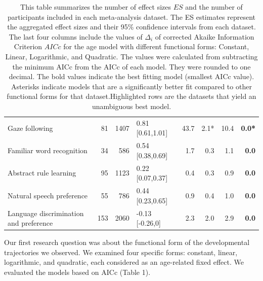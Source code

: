 \documentclass[10pt, letterpaper]{article}
\begin{document}
\begin{table}[ht]
\begin{tabular}{l|r|r|l|r|r|r|r}
Gaze following  & 81 & 1407 & 0.81 [0.61,1.01] & 43.7 & 2.1* & 10.4 & \textbf{0.0*}\\
Familiar word recognition & 34 & 586 & 0.54 [0.38,0.69] & 1.7 & 0.3 & 1.1 & \textbf{0.0}\\
Abstract rule learning & 95 & 1123 & 0.22 [0.07,0.37] & 0.4 & 0.3 & 0.9 & \textbf{0.0}\\
Natural speech preference & 55 & 786 & 0.44 [0.23,0.65] & 0.9 & 0.4 & 1.0 & \textbf{0.0}\\
Language discrimination and preference & 153 & 2060 & -0.13 [-0.26,0] & 2.3 & 2.0 & 2.9 & \textbf{0.0}\\


\hline
\end{tabular}
\caption{\label{demo-table}This table summarizes the number of effect sizes \(ES\) and the number of participants included in each meta-analysis dataset. The ES estimates represent the aggregated effect sizes and their 95\% confidence intervals from each dataset. The last four columns include the values of $\Delta_{i}$ of corrected Akaike Information Criterion \(AICc\) for the age model with different functional forms: Constant, Linear, Logarithmic, and Quadratic. The values were calculated from subtracting the minimum AICc from the AICc of each model. They were rounded to one decimal. The bold values indicate the best fitting model (smallest AICc value). Asterisks indicate models that are a significantly better fit compared to other functional forms for that dataset.Highlighted rows are the datasets that yield an unambiguous best model.}
\end{table}

Our first research question was about the functional form of the
developmental trajectories we observed. We examined four specific forms:
constant, linear, logarithmic, and quadratic, each considered as an
age-related fixed effect. We evaluated the models based on AICc (Table
1).
\end{document}
